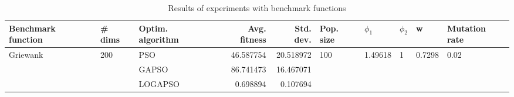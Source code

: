 \begin{table}
\centering
\caption{Results of experiments with benchmark functions}
\begin{tabular}{lllrrlllll}
\toprule
       Benchmark function &              \# dims & Optim. algorithm &  Avg. fitness &  Std. dev. &            Pop. size &               $\phi_{1}$ &         $\phi_{2}$ &                       w &         Mutation rate \\
\midrule
\multirow{3}{*}{Griewank} & \multirow{3}{*}{200} &              PSO &     46.587754 &  20.518972 & \multirow{3}{*}{100} & \multirow{3}{*}{1.49618} & \multirow{3}{*}{1} & \multirow{3}{*}{0.7298} & \multirow{3}{*}{0.02} \\
                          &                      &            GAPSO &     86.741473 &  16.467071 &                      &                          &                    &                         &                       \\
                          &                      &          LOGAPSO &      0.698894 &   0.107694 &                      &                          &                    &                         &                       \\
\bottomrule
\end{tabular}
\end{table}
